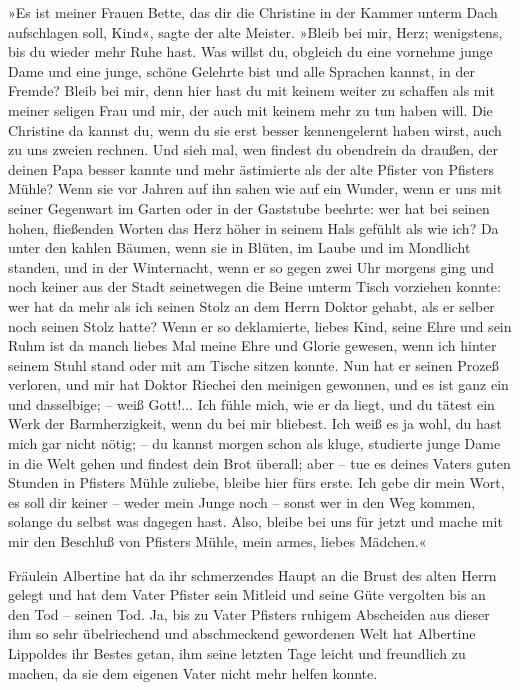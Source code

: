 »Es ist meiner Frauen Bette, das dir die Christine in der Kammer
unterm Dach aufschlagen soll, Kind«, sagte der alte Meister. »Bleib
bei mir, Herz; wenigstens, bis du wieder mehr Ruhe hast. Was willst
du, obgleich du eine vornehme junge Dame und eine junge, schöne
Gelehrte bist und alle Sprachen kannst, in der Fremde? Bleib bei
mir, denn hier hast du mit keinem weiter zu schaffen als mit meiner
seligen Frau und mir, der auch mit keinem mehr zu tun haben will.
Die Christine da kannst du, wenn du sie erst besser kennengelernt
haben wirst, auch zu uns zweien rechnen. Und sieh mal, wen findest
du obendrein da draußen, der deinen Papa besser kannte und mehr
ästimierte als der alte Pfister von Pfisters Mühle? Wenn sie vor
Jahren auf ihn sahen wie auf ein Wunder, wenn er uns mit seiner
Gegenwart im Garten oder in der Gaststube beehrte: wer hat bei
seinen hohen, fließenden Worten das Herz höher in seinem Hals
gefühlt als wie ich? Da unter den kahlen Bäumen, wenn sie in
Blüten, im Laube und im Mondlicht standen, und in der Winternacht,
wenn er so gegen zwei Uhr morgens ging und noch keiner aus der
Stadt seinetwegen die Beine unterm Tisch vorziehen konnte: wer hat
da mehr als ich seinen Stolz an dem Herrn Doktor gehabt, als er
selber noch seinen Stolz hatte? Wenn er so deklamierte, liebes
Kind, seine Ehre und sein Ruhm ist da manch liebes Mal meine Ehre
und Glorie gewesen, wenn ich hinter seinem Stuhl stand oder mit am
Tische sitzen konnte. Nun hat er seinen Prozeß verloren, und mir
hat Doktor Riechei den meinigen gewonnen, und es ist ganz ein und
dasselbige; – weiß Gott!... Ich fühle mich, wie er da liegt, und du
tätest ein Werk der Barmherzigkeit, wenn du bei mir bliebest. Ich
weiß es ja wohl, du hast mich gar nicht nötig; – du kannst morgen
schon als kluge, studierte junge Dame in die Welt gehen und findest
dein Brot überall; aber – tue es deines Vaters guten Stunden in
Pfisters Mühle zuliebe, bleibe hier fürs erste. Ich gebe dir mein
Wort, es soll dir keiner – weder mein Junge noch – sonst wer in den
Weg kommen, solange du selbst was dagegen hast. Also, bleibe bei
uns für jetzt und mache mit mir den Beschluß von Pfisters Mühle,
mein armes, liebes Mädchen.«

Fräulein Albertine hat da ihr schmerzendes Haupt an die Brust des
alten Herrn gelegt und hat dem Vater Pfister sein Mitleid und seine
Güte vergolten bis an den Tod – seinen Tod. Ja, bis zu Vater
Pfisters ruhigem Abscheiden aus dieser ihm so sehr übelriechend und
abschmeckend gewordenen Welt hat Albertine Lippoldes ihr Bestes
getan, ihm seine letzten Tage leicht und freundlich zu machen, da
sie dem eigenen Vater nicht mehr helfen konnte.

